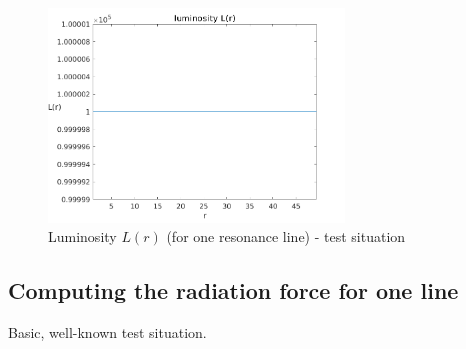 \documentclass[../main/main.tex]{subfiles}
\begin{document}
\begin{figure}[!htp]
\centering
\includegraphics[width=0.7\textwidth]{../../two_resonance_lines/figures/luminosity_one_resonance_line_one_direction.png}
\caption{Luminosity $L(r)$ (for one resonance line) - test situation}
\label{luminosity_one_resonance_line_test}
\end{figure}

\newpage
\subsection{Computing the radiation force for one line}
Basic, well-known test situation.
\end{document}
